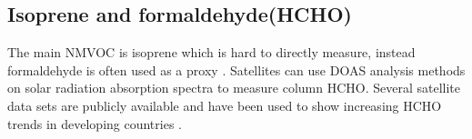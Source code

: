 \subsection{Isoprene and formaldehyde(HCHO)}

The main NMVOC is isoprene \cite{Guenther_2006} which is hard to directly measure, instead formaldehyde is often used as a proxy \cite{Marais_2012,bauwens2013satellite}. 
Satellites can use DOAS analysis methods on solar radiation absorption spectra to measure column HCHO.
Several satellite data sets are publicly available and have been used to show increasing HCHO trends in developing countries \cite{Mahajan_2015}.
  
  